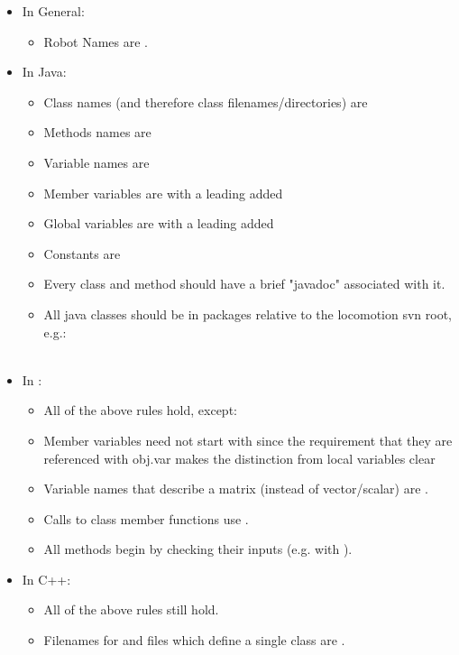\begin{itemize}
\item In General: 
\begin{itemize}
\item Robot Names are .
\end{itemize}
\item In Java:
\begin{itemize}
\item Class names (and therefore class filenames/directories) are 
\item  Methods names are 
\item  Variable names are 
\item Member variables are  with a leading  added
\item Global variables are  with a leading  added
\item  Constants are 
\item Every class and method should have a brief "javadoc" associated with it.
\item  All java classes should be in packages relative to the locomotion svn root, e.g.: \\
    \\
\end{itemize}
\item In \matlab: 
\begin{itemize}
\item All of the above rules hold, except:
\item Member variables need not start with  since the requirement that they are referenced with obj.var makes the distinction from local variables clear
\item Variable names that describe a matrix (instead of vector/scalar) are .
\item Calls to \matlab class member functions use .
\item  All methods begin by checking their inputs (e.g. with ).
\end{itemize}
\item In C++: 
\begin{itemize}
\item All of the above rules still hold.
\item Filenames for  and  files which define a single class are .

\end{itemize}
\end{itemize}
